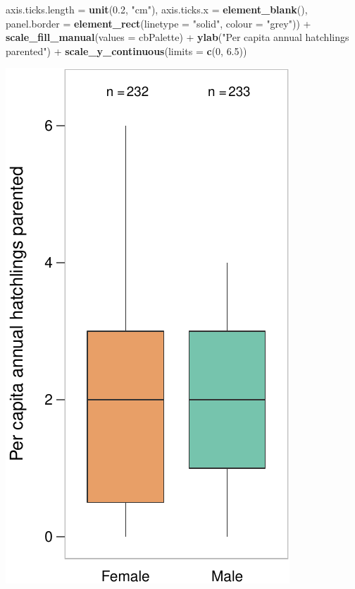 \documentclass[]{article}
\newenvironment{Shaded}{\begin{snugshade}}{\end{snugshade}}
\newcommand{\KeywordTok}[1]{\textcolor[rgb]{0.13,0.29,0.53}{\textbf{{#1}}}}
\newcommand{\DataTypeTok}[1]{\textcolor[rgb]{0.13,0.29,0.53}{{#1}}}
\newcommand{\DecValTok}[1]{\textcolor[rgb]{0.00,0.00,0.81}{{#1}}}
\newcommand{\FloatTok}[1]{\textcolor[rgb]{0.00,0.00,0.81}{{#1}}}
\newcommand{\StringTok}[1]{\textcolor[rgb]{0.31,0.60,0.02}{{#1}}}
\newcommand{\NormalTok}[1]{{#1}}
\begin{document}
\begin{Shaded}
\begin{Highlighting}[]
        \DataTypeTok{axis.ticks.length =} \KeywordTok{unit}\NormalTok{(}\FloatTok{0.2}\NormalTok{, }\StringTok{"cm"}\NormalTok{),}
        \DataTypeTok{axis.ticks.x =} \KeywordTok{element_blank}\NormalTok{(),}
        \DataTypeTok{panel.border =} \KeywordTok{element_rect}\NormalTok{(}\DataTypeTok{linetype =} \StringTok{"solid"}\NormalTok{, }\DataTypeTok{colour =} \StringTok{"grey"}\NormalTok{)) +}
\StringTok{  }\KeywordTok{scale_fill_manual}\NormalTok{(}\DataTypeTok{values =} \NormalTok{cbPalette) +}
\StringTok{  }\KeywordTok{ylab}\NormalTok{(}\StringTok{"Per capita annual hatchlings parented"}\NormalTok{) +}
\StringTok{  }\KeywordTok{scale_y_continuous}\NormalTok{(}\DataTypeTok{limits =} \KeywordTok{c}\NormalTok{(}\DecValTok{0}\NormalTok{, }\FloatTok{6.5}\NormalTok{))}
\end{Highlighting}
\end{Shaded}

\begin{center}\includegraphics{Ceuta_ASR_Matrix_Modeling_files/figure-latex/unnamed-chunk-17-1} \end{center}
\end{document}
